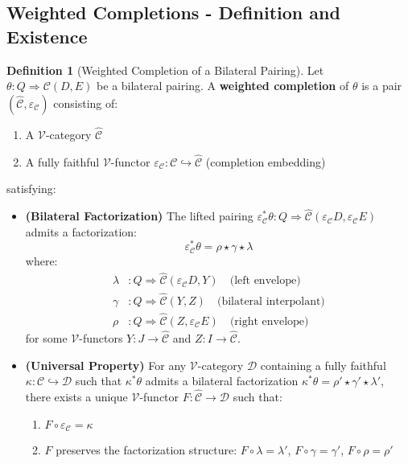 \documentclass[11pt]{article}
\theoremstyle{plain}
\theoremstyle{definition}
\newtheorem{definition}[theorem]{Definition}
\theoremstyle{remark}
\newcommand{\V}{\mathcal{V}}
\begin{document}
\subsection{Weighted Completions - Definition and Existence}

\begin{definition}[Weighted Completion of a Bilateral Pairing]\label{def:weighted-completion}
Let $\theta : Q \Rightarrow \mathcal{C}(D,E)$ be a bilateral pairing. A \textbf{weighted completion} of $\theta$ is a pair $(\widehat{\mathcal{C}}, \varepsilon_{\mathcal{C}})$ consisting of:
\begin{enumerate}
\item A $\V$-category $\widehat{\mathcal{C}}$
\item A fully faithful $\V$-functor $\varepsilon_{\mathcal{C}} : \mathcal{C} \hookrightarrow \widehat{\mathcal{C}}$ (completion embedding)
\end{enumerate}
satisfying:

\begin{itemize}
\item \textbf{(Bilateral Factorization)} The lifted pairing $\varepsilon_{\mathcal{C}}^* \theta : Q \Rightarrow \widehat{\mathcal{C}}(\varepsilon_{\mathcal{C}} D, \varepsilon_{\mathcal{C}} E)$ admits a factorization:
$$\varepsilon_{\mathcal{C}}^* \theta = \rho \star \gamma \star \lambda$$
where:
\begin{align}
\lambda &: Q \Rightarrow \widehat{\mathcal{C}}(\varepsilon_{\mathcal{C}} D, Y) \quad \text{(left envelope)} \\
\gamma &: Q \Rightarrow \widehat{\mathcal{C}}(Y, Z) \quad \text{(bilateral interpolant)} \\
\rho &: Q \Rightarrow \widehat{\mathcal{C}}(Z, \varepsilon_{\mathcal{C}} E) \quad \text{(right envelope)}
\end{align}
for some $\V$-functors $Y : J \to \widehat{\mathcal{C}}$ and $Z : I \to \widehat{\mathcal{C}}$.

\item \textbf{(Universal Property)} For any $\V$-category $\mathcal{D}$ containing a fully faithful $\kappa : \mathcal{C} \hookrightarrow \mathcal{D}$ such that $\kappa^* \theta$ admits a bilateral factorization $\kappa^* \theta = \rho' \star \gamma' \star \lambda'$, there exists a unique $\V$-functor $F : \widehat{\mathcal{C}} \to \mathcal{D}$ such that:
\begin{enumerate}
\item $F \circ \varepsilon_{\mathcal{C}} = \kappa$
\item $F$ preserves the factorization structure: $F \circ \lambda = \lambda'$, $F \circ \gamma = \gamma'$, $F \circ \rho = \rho'$
\end{enumerate}
\end{itemize}
\end{definition}
\end{document}
